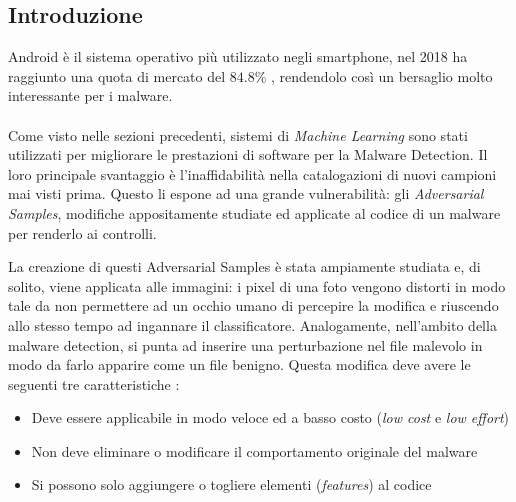 \subsection{Introduzione}   %

Android è il sistema operativo più utilizzato negli smartphone, nel 2018 ha raggiunto una quota di mercato del \(84.8\%\) \cite{8672711}, rendendolo così un bersaglio molto interessante per i malware.\\
\\
Come visto nelle sezioni precedenti, sistemi di \textit{Machine Learning} sono stati utilizzati per migliorare le prestazioni di software per la Malware Detection. Il loro principale svantaggio è l'inaffidabilità nella catalogazioni \cite{8672711} di nuovi campioni mai visti prima. Questo li espone ad una grande vulnerabilità: gli \textit{Adversarial Samples}, modifiche appositamente studiate ed applicate al codice di un malware per renderlo  ai controlli.

La creazione di questi Adversarial Samples è stata ampiamente studiata e, di solito, viene applicata alle immagini: i pixel di una foto vengono distorti in modo tale da non permettere ad un occhio umano di percepire la modifica e riuscendo allo stesso tempo ad ingannare il classificatore. Analogamente, nell'ambito della malware detection, si punta ad inserire una perturbazione nel file malevolo in modo da farlo apparire come un file benigno. Questa modifica deve avere le seguenti tre caratteristiche \cite{8672711}:

\begin{itemize}
    \item Deve essere applicabile in modo veloce ed a basso costo (\textit{low cost} e \textit{low effort})
    \item Non deve eliminare o modificare il comportamento originale del malware
    \item Si possono solo aggiungere o togliere elementi (\textit{features}) al codice 
\end{itemize}



